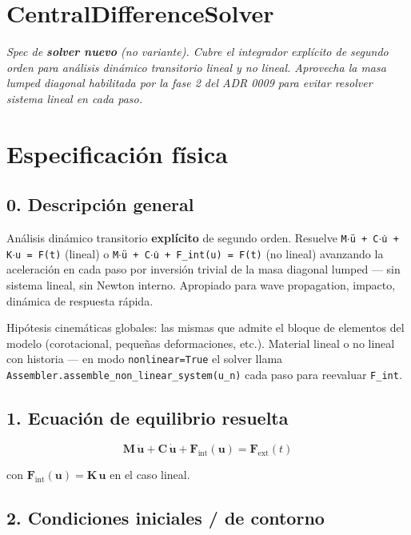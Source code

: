 \documentclass[11pt,letterpaper,oneside]{report}
\begin{document}
\section{CentralDifferenceSolver}



\textit{Spec de \textbf{solver nuevo} (no variante). Cubre el integrador explícito de segundo orden para análisis dinámico transitorio lineal y no lineal. Aprovecha la masa lumped diagonal habilitada por la fase 2 del ADR 0009 para evitar resolver sistema lineal en cada paso.}



\section{Especificación física}

\subsection{0. Descripción general}

Análisis dinámico transitorio \textbf{explícito} de segundo orden. Resuelve \texttt{M\ensuremath{\cdot}ü + C\ensuremath{\cdot}u̇ + K\ensuremath{\cdot}u = F(t)} (lineal) o \texttt{M\ensuremath{\cdot}ü + C\ensuremath{\cdot}u̇ + F\_int(u) = F(t)} (no lineal) avanzando la aceleración en cada paso por inversión trivial de la masa diagonal lumped --- sin sistema lineal, sin Newton interno. Apropiado para wave propagation, impacto, dinámica de respuesta rápida.

Hipótesis cinemáticas globales: las mismas que admite el bloque de elementos del modelo (corotacional, pequeñas deformaciones, etc.). Material lineal o no lineal con historia --- en modo \texttt{nonlinear=True} el solver llama \texttt{Assembler.assemble\_non\_linear\_system(u\_n)} cada paso para reevaluar \texttt{F\_int}.

\subsection{1. Ecuación de equilibrio resuelta}

\[
\mathbf{M}\,\ddot{\mathbf{u}} + \mathbf{C}\,\dot{\mathbf{u}} + \mathbf{F}_\text{int}(\mathbf{u}) = \mathbf{F}_\text{ext}(t)
\]

con $\mathbf{F}_\text{int}(\mathbf{u}) = \mathbf{K}\,\mathbf{u}$ en el caso lineal.

\subsection{2. Condiciones iniciales / de contorno}
\end{document}
